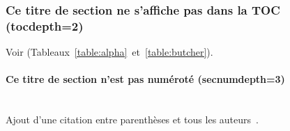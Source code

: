 \subsubsection{Ce titre de section ne s'affiche pas dans la TOC (tocdepth=2)}
Voir (Tableaux~\ref{table:alpha}~et~\ref{table:butcher}).
\paragraph{Ce titre de section n'est pas numéroté (secnumdepth=3)}~~\\ %

Ajout d'une citation entre parenthèses et tous les auteurs~\parencite{zohdy_mapping_2012}.
